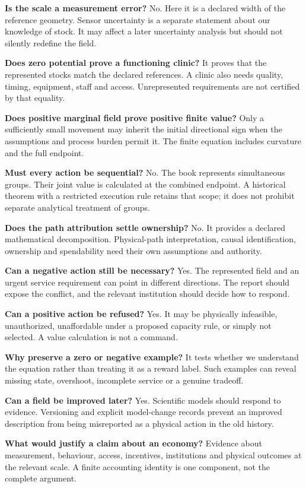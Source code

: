 \textbf{Is the scale a measurement error?} No. Here it is a declared width of the reference geometry. Sensor uncertainty is a separate statement about our knowledge of stock. It may affect a later uncertainty analysis but should not silently redefine the field.

\textbf{Does zero potential prove a functioning clinic?} It proves that the represented stocks match the declared references. A clinic also needs quality, timing, equipment, staff and access. Unrepresented requirements are not certified by that equality.

\textbf{Does positive marginal field prove positive finite value?} Only a sufficiently small movement may inherit the initial directional sign when the assumptions and process burden permit it. The finite equation includes curvature and the full endpoint.

\textbf{Must every action be sequential?} No. The book represents simultaneous groups. Their joint value is calculated at the combined endpoint. A historical theorem with a restricted execution rule retains that scope; it does not prohibit separate analytical treatment of groups.

\textbf{Does the path attribution settle ownership?} No. It provides a declared mathematical decomposition. Physical-path interpretation, causal identification, ownership and spendability need their own assumptions and authority.

\textbf{Can a negative action still be necessary?} Yes. The represented field and an urgent service requirement can point in different directions. The report should expose the conflict, and the relevant institution should decide how to respond.

\textbf{Can a positive action be refused?} Yes. It may be physically infeasible, unauthorized, unaffordable under a proposed capacity rule, or simply not selected. A value calculation is not a command.

\textbf{Why preserve a zero or negative example?} It tests whether we understand the equation rather than treating it as a reward label. Such examples can reveal missing state, overshoot, incomplete service or a genuine tradeoff.

\textbf{Can a field be improved later?} Yes. Scientific models should respond to evidence. Versioning and explicit model-change records prevent an improved description from being misreported as a physical action in the old history.

\textbf{What would justify a claim about an economy?} Evidence about measurement, behaviour, access, incentives, institutions and physical outcomes at the relevant scale. A finite accounting identity is one component, not the complete argument.

